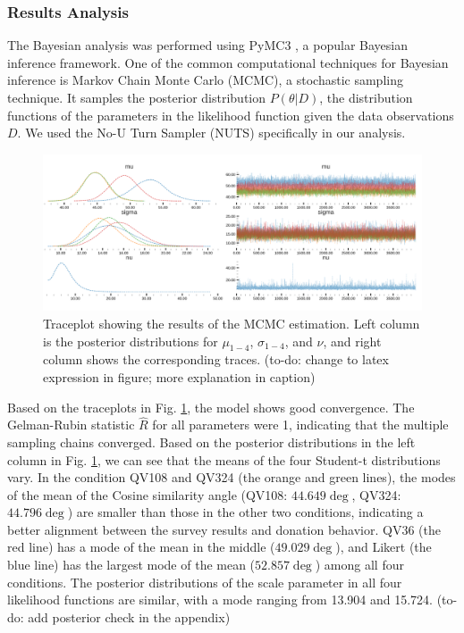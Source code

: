 \subsubsection{Results Analysis}
    

The Bayesian analysis was performed using PyMC3 \cite{salvatier2016probabilistic}, a popular Bayesian inference framework. One of the common computational techniques for Bayesian inference is Markov Chain Monte Carlo (MCMC), a stochastic sampling technique. It samples the posterior distribution $P(\theta | D)$, the distribution functions of the parameters in the likelihood function given the data observations $D$. We used the No-U Turn Sampler (NUTS) specifically in our analysis. 

\begin{figure}[htpb]
    \centering
    \includegraphics[width=\textwidth, keepaspectratio=true]{content/image/traceplot.png}
    \caption{
      Traceplot showing the results of the MCMC estimation. Left column is the posterior distributions for $\mu_{1-4}$, $\sigma_{1-4}$, and $\nu$, and right column shows the corresponding traces. (to-do: change to latex expression in figure; more explanation in caption)
    }
    \label{fig:traceplot_exp1}
\end{figure}

Based on the traceplots in Fig. \ref{fig:traceplot_exp1}, the model shows good convergence. The Gelman-Rubin statistic $\hat{R}$ for all parameters were 1, indicating that the multiple sampling chains converged. Based on the posterior distributions in the left column in Fig. \ref{fig:traceplot_exp1}, we can see that the means of the four Student-t distributions vary. In the condition QV108 and QV324 (the orange and green lines), the modes of the mean of the Cosine similarity angle (QV108: $44.649 \deg$, QV324: $44.796 \deg$) are smaller than those in the other two conditions, indicating a better alignment between the survey results and donation behavior. QV36 (the red line) has a mode of the mean in the middle ($49.029 \deg$), and Likert (the blue line) has the largest mode of the mean ($52.857 \deg$) among all four conditions. The posterior distributions of the scale parameter in all four likelihood functions are similar, with a mode ranging from 13.904 and 15.724. (to-do: add posterior check in the appendix)

